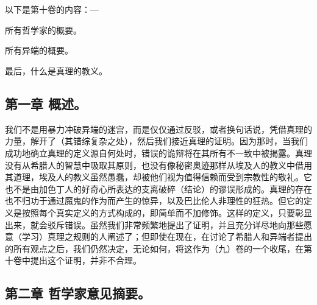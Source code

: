 
\section{}


\subsection{}

以下是第十卷的内容：—\par

所有哲学家的概要。\par

所有异端的概要。\par

最后，什么是真理的教义。\par


\subsection{第一章 概述。}

我们不是用暴力冲破异端的迷宫，而是仅仅通过反驳，或者换句话说，凭借真理的力量，解开了（其错综复杂之处），然后我们接近真理的证明。因为那时，当我们成功地确立真理的定义源自何处时，错误的诡辩将在其所有不一致中被揭露。真理没有从希腊人的智慧中吸取其原则，也没有像秘密奥迹那样从埃及人的教义中借用其道理，埃及人的教义虽然愚蠢，却被他们视为值得信赖而受到宗教性的敬礼。它也不是由加色丁人的好奇心所表达的支离破碎（结论）的谬误形成的。真理的存在也不归功于通过魔鬼的作为而产生的惊异，以及巴比伦人非理性的狂热。但它的定义是按照每个真实定义的方式构成的，即简单而不加修饰。这样的定义，只要彰显出来，就会驳斥错误。虽然我们非常频繁地提出了证明，并且充分详尽地向那些愿意（学习）真理之规则的人阐述了；但即使在现在，在讨论了希腊人和异端者提出的所有观点之后，我们仍然决定，无论如何，将这作为（九）卷的一个收尾，在第十卷中提出这个证明，并非不合理。\par


\subsection{第二章 哲学家意见摘要。}

